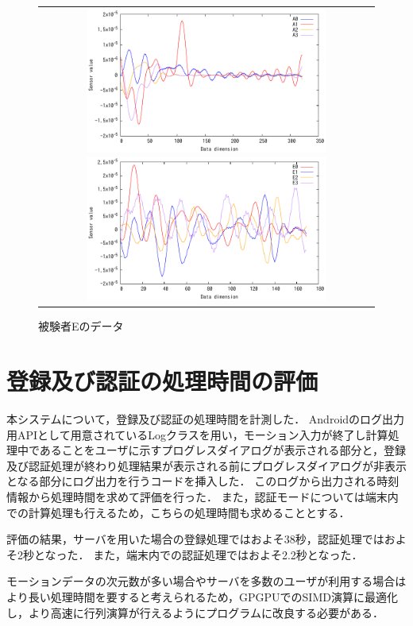 \begin{figure}[bthp]
  \centering
  \begin{tabular}{c}
    \begin{minipage}{.48\hsize}
      \centering
      \includegraphics[bb=0 0 360 216, width=8cm]{Graphs/comp_A.pdf}
      \caption{被験者Aのデータ}
      \label{comp-a}
    \end{minipage}
    \begin{minipage}{.48\hsize}
      \centering
      \includegraphics[bb=0 0 360 216, width=8cm]{Graphs/comp_E.pdf}
      \caption{被験者Eのデータ}
      \label{comp-e}
    \end{minipage}
  \end{tabular}
\end{figure}

\section{登録及び認証の処理時間の評価}
本システムについて，登録及び認証の処理時間を計測した．
Androidのログ出力用APIとして用意されているLogクラス\cite{5-log}を用い，モーション入力が終了し計算処理中であることをユーザに示すプログレスダイアログが表示される部分と，登録及び認証処理が終わり処理結果が表示される前にプログレスダイアログが非表示となる部分にログ出力を行うコードを挿入した．
このログから出力される時刻情報から処理時間を求めて評価を行った．
また，認証モードについては端末内での計算処理も行えるため，こちらの処理時間も求めることとする．

評価の結果，サーバを用いた場合の登録処理ではおよそ38秒，認証処理ではおよそ2秒となった．
また，端末内での認証処理ではおよそ2.2秒となった．

モーションデータの次元数が多い場合やサーバを多数のユーザが利用する場合はより長い処理時間を要すると考えられるため，GPGPUでのSIMD演算に最適化し，より高速に行列演算が行えるようにプログラムに改良する必要がある．
